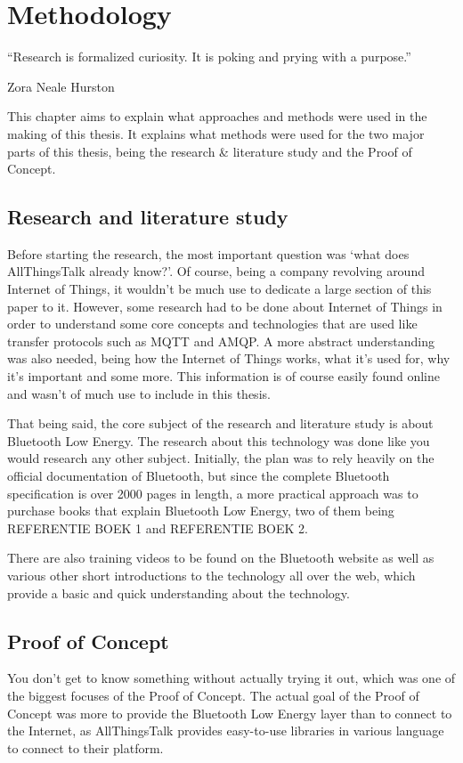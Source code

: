 \documentclass[pdftex,a4paper,12pt,twoside]{report}
\begin{document}

\chapter{Methodology}
\label{ch:methodology}
\epigraph{``Research is formalized curiosity. It is poking and prying with a purpose.''}{Zora Neale Hurston}
This chapter aims to explain what approaches and methods were used in the making of this thesis. It explains what methods were used for the two major parts of this thesis, being the research \& literature study and the Proof of Concept.

\section{Research and literature study}
\label{sec:researchlit}
Before starting the research, the most important question was `what does AllThingsTalk already know?'. Of course, being a company revolving around Internet of Things, it wouldn't be much use to dedicate a large section of this paper to it. However, some research had to be done about Internet of Things in order to understand some core concepts and technologies that are  used like transfer protocols such as MQTT and AMQP. A more abstract understanding was also needed, being how the Internet of Things works, what it's used for, why it's important and some more. This information is of course easily found online and wasn't of much use to include in this thesis.

That being said, the core subject of the research and literature study is about Bluetooth Low Energy. The research about this technology was done like you would research any other subject. Initially, the plan was to rely heavily on the official documentation of Bluetooth, but since the complete Bluetooth specification is over 2000 pages in length, a more practical approach was to purchase books that explain Bluetooth Low Energy, two of them being REFERENTIE BOEK 1 and REFERENTIE BOEK 2.

There are also training videos to be found on the Bluetooth website as well as various other short introductions to the technology all over the web, which provide a basic and quick understanding about the technology.

\section{Proof of Concept}
\label{sec:poc}
You don't get to know something without actually trying it out, which was one of the biggest focuses of the Proof of Concept. The actual goal of the Proof of Concept was more to provide the Bluetooth Low Energy layer than to connect to the Internet, as AllThingsTalk provides easy-to-use libraries in various language to connect to their platform.
\end{document}
